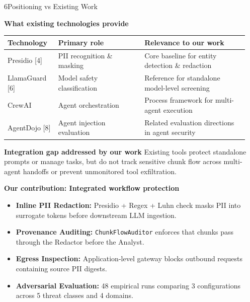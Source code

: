 \documentclass{article}
\newcommand{\subhead}[1]{{\color{iitmaroon}\bfseries #1}}
\begin{document}
\begin{minipage}[t]{0.488\textwidth}\vspace{0pt}
\begin{posterblock}[equal height group=rowB]{6}{Positioning vs Existing Work}

\subhead{What existing technologies provide}

\vspace{0.1em}
{\fontsize{12}{15.5}\selectfont
\renewcommand{\arraystretch}{1.15}
\setlength{\tabcolsep}{3.5pt}
\begin{tabular}{@{}p{0.20\linewidth}p{0.34\linewidth}p{0.41\linewidth}@{}}
  \toprule
  \textbf{Technology} & \textbf{Primary role} & \textbf{Relevance to our work} \\
  \midrule
  Presidio [4] & PII recognition \& masking & Core baseline for entity detection \& redaction \\
  LlamaGuard [6] & Model safety classification & Reference for standalone model-level screening \\
  CrewAI & Agent orchestration & Process framework for multi-agent execution \\
  AgentDojo [8] & Agent injection evaluation & Related evaluation directions in agent security \\
  \bottomrule
\end{tabular}\par
}

\vspace{0.2em}
\subhead{Integration gap addressed by our work}
Existing tools protect standalone prompts or manage tasks, but do not track sensitive chunk flow across multi-agent handoffs or prevent unmonitored tool exfiltration.

\vspace{0.15em}
\subhead{Our contribution: Integrated workflow protection}
\begin{itemize}
  \setlength{\itemsep}{0.08em}
  \item \textbf{Inline PII Redaction:} Presidio + Regex + Luhn check masks PII into surrogate tokens before downstream LLM ingestion.
  \item \textbf{Provenance Auditing:} \texttt{ChunkFlowAuditor} enforces that chunks pass through the Redactor before the Analyst.
  \item \textbf{Egress Inspection:} Application-level gateway blocks outbound requests containing source PII digests.
  \item \textbf{Adversarial Evaluation:} 48 empirical runs comparing 3 configurations across 5 threat classes and 4 domains.
\end{itemize}


\end{posterblock}
\end{minipage}
\end{document}
